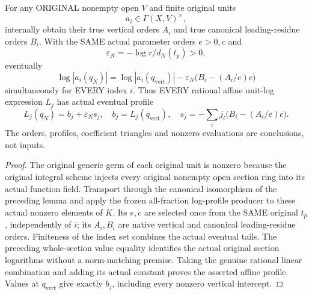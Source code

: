 \begin{lemma}
\label{lem:gauss-native-original-unit-profiles}
\leanok
\leavevmode\par
For any ORIGINAL nonempty open $V$ and finite original units
\[
 a_i\in\Gamma(X,V)^\times,
\]
internally obtain their true vertical orders
$A_i$ and true canonical leading-residue orders $B_i$. With the SAME actual
parameter orders $e>0,c$ and
\[
 \varepsilon_N=-\log r/d_N(t_p)>0,
\]
eventually
\[
 \log|a_i(q_N)|=\log|a_i(q_{\mathrm{vert}})|
       -\varepsilon_N\bigl(B_i-(A_i/e)c\bigr)
\]
simultaneously for EVERY index $i$. Thus EVERY rational affine unit-log
expression $L_j$ has actual eventual profile
\[
 L_j(q_N)=b_j+\varepsilon_N s_j,\quad
 b_j=L_j(q_{\mathrm{vert}}),\quad
 s_j=-\sum_i j_i\bigl(B_i-(A_i/e)c\bigr).
\]
The orders, profiles, coefficient triangles and nonzero evaluations are
conclusions, not inputs.
\end{lemma}
\begin{proof}
The original generic germ of each original unit is nonzero because the
original integral scheme injects every original nonempty open section ring
into its actual function field. Transport through the canonical isomorphism
of the preceding lemma and apply the frozen all-fraction log-profile
producer to these actual nonzero elements of $K$. Its $e,c$ are selected
once from the SAME original $t_p$, independently of $i$; its $A_i,B_i$ are
native vertical and canonical leading-residue orders. Finiteness of the
index set combines the actual eventual tails. The preceding whole-section
value equality identifies the actual original section logarithms without a
norm-matching premise. Taking the genuine rational linear combination and
adding its actual constant proves the asserted affine profile. Values at
$q_{\mathrm{vert}}$ give exactly $b_j$, including every nonzero vertical intercept.
\end{proof}

